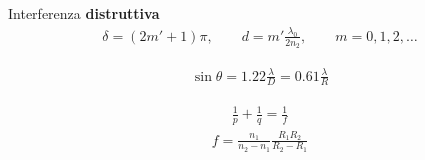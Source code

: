 \documentclass[10pt, twocolumn, a4paper, fleqn]{article}
\def\b{\textbf}
\def\({\left(}
\def\){\right)}
\def\n{n_}
\begin{document}
Interferenza \b{distruttiva}
\begin{equation*}\begin{split}
\delta=\(2m'+1\)\pi, \qquad d=m'\frac{\lambda_0}{2n_2}, \qquad m=0,1,2, \dots
\end{split}\end{equation*}

\begin{equation*}\begin{split}
\sin{\theta}=1.22\frac{\lambda}{D}=0.61\frac{\lambda}{R}
\end{split}\end{equation*}

\begin{equation*}\begin{split}
\frac{1}{p}+\frac{1}{q}=\frac{1}{f}
\end{split}\end{equation*}
\begin{equation*}\begin{split}
f=\frac{\n1}{\n2-\n1}\frac{R_1R_2}{R_2-R_1}
\end{split}\end{equation*}

\clearpage
\end{document}
